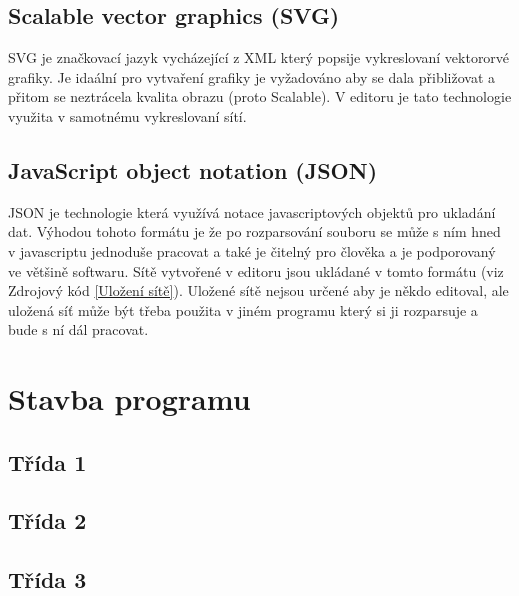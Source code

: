 \documentclass[
  biblatex,
  glossaries,
  index
]{kidiplom}
\begin{document}
\subsection{Scalable vector graphics (SVG)}
SVG je značkovací jazyk vycházející z XML který popsije vykreslovaní 
vektororvé grafiky. Je idaální pro vytvaření grafiky je vyžadováno
aby se dala přibližovat a přitom se neztrácela kvalita obrazu (proto Scalable).
V editoru je tato technologie využita v samotnému vykreslovaní sítí.

\subsection{JavaScript object notation (JSON)}
JSON je technologie která využívá notace javascriptových objektů pro ukladání dat.
Výhodou tohoto formátu je že po rozparsování souboru se může s ním hned v 
javascriptu jednoduše pracovat a také je čitelný pro člověka a je podporovaný ve většině softwaru.
Sítě vytvořené v editoru jsou ukládané v tomto formátu (viz Zdrojový kód \ref{Uložení sítě}).
Uložené sítě nejsou určené aby je někdo editoval, ale uložená síť může být třeba 
použita v jiném programu který si ji rozparsuje a bude s ní dál pracovat.


\section{Stavba programu}

\subsection{Třída 1}
\subsection{Třída 2}
\subsection{Třída 3}
\end{document}
